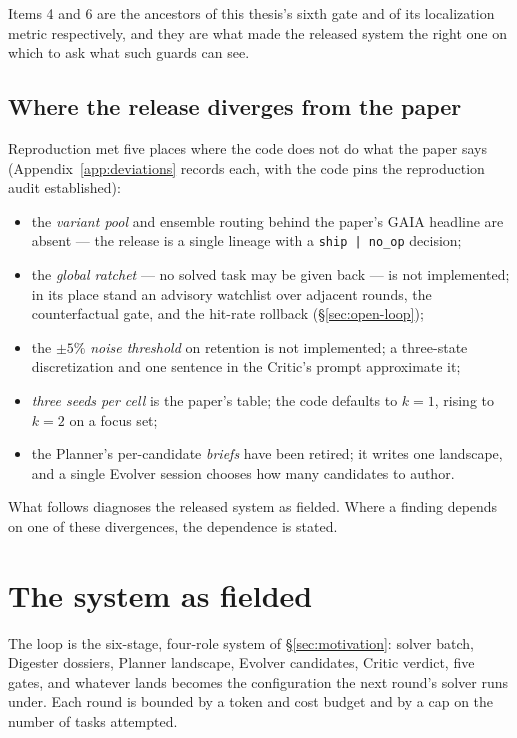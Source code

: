 Items 4 and 6 are the ancestors of this thesis's sixth gate and of its
localization metric respectively, and they are what made the released
system the right one on which to ask what such guards can see.

\subsection*{Where the release diverges from the paper}

Reproduction met five places where the code does not do what the paper
says (Appendix~\ref{app:deviations} records each, with the code pins the
reproduction audit established):

\begin{itemize}
  \item the \emph{variant pool} and ensemble routing behind the paper's
        GAIA headline are absent --- the release is a single lineage with a
        \texttt{ship\,|\,no\_op} decision;
  \item the \emph{global ratchet} --- no solved task may be given back ---
        is not implemented; in its place stand an advisory watchlist over
        adjacent rounds, the counterfactual gate, and the hit-rate rollback
        (\S\ref{sec:open-loop});
  \item the $\pm 5\%$ \emph{noise threshold} on retention is not
        implemented; a three-state discretization and one sentence in the
        Critic's prompt approximate it;
  \item \emph{three seeds per cell} is the paper's table; the code defaults
        to $k{=}1$, rising to $k{=}2$ on a focus set;
  \item the Planner's per-candidate \emph{briefs} have been retired; it
        writes one landscape, and a single Evolver session chooses how many
        candidates to author.
\end{itemize}

What follows diagnoses the released system as fielded. Where a finding
depends on one of these divergences, the dependence is stated.

\section{The system as fielded}
\label{sec:fielded}

The loop is the six-stage, four-role system of \S\ref{sec:motivation}:
solver batch, Digester dossiers, Planner landscape, Evolver candidates,
Critic verdict, five gates, and whatever lands becomes the configuration
the next round's solver runs under. Each round is bounded by a token and
cost budget and by a cap on the number of tasks attempted.

